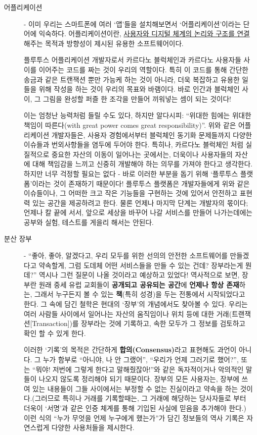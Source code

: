 \documentclass[a4paper, 11pt]{article}
\begin{document}
    \begin{description}
        \item[어플리케이션] - 이미 우리는 스마트폰에 여러 `앱'들을 설치해보면서 `어플리케이션'이라는 단어에 익숙하다. 어플리케이션이란, \uline{사용자와 디지털 체계의 논리와 구조를 연결}해주는 목적과 방향성이 제시된 유용한 소프트웨어이다.

        플루투스 어플리케이션 개발자로서 카르다노 블럭체인과 카르다노 사용자들 사이를 이어주는 코드를 짜는 것이 우리의 역할이다. 특히 이 코드를 통해 간단한 송금과 같은 트랜잭션 뿐만 가능케 하는 것이 아니라, 더욱 복잡하고 유용한 일들을 위해 작성을 하는 것이 우리의 목표와 바램이다. 바로 인간과 블럭체인 사이, 그 그림을 완성할 퍼즐 한 조각을 만들어 끼워넣는 셈이 되는 것이다!

        이는 엄청난 능력처럼 들릴 수도 있다, 하지만 알다시피: ``위대한 힘에는 위대한 책임이 따른다(with great power comes great responsibility)''. 위와 같은 어플리케이션 개발자들은, 사용자 경험에서부터 블럭체인 동기화 문제들까지 다양한 이슈들과 번외사항들을 염두에 두어야 한다. 특히나, 카르다노 블럭체인 처럼 실질적으로 중요한 자산의 이동이 일어나는 곳에서는, 더욱이나 사용자들의 자산에 대해 책임감을 느끼고 신중히 개발해야 하는 의무를 가져야 한다고 생각한다. 하지만 너무 걱정할 필요는 없다 - 바로 이러한 부분을 돕기 위해 `플루투스 플랫폼'이라는 것이 존재하기 때문이다! 플루투스 플랫폼은 개발자들에게 위와 같은 이슈들이나, 그 어떠한 크고 작은 기능들을 구현하는 것에 있어서 안전하고 표현력 있는 공간을 제공하려고 한다. 물론 언제나 마지막 단계는 개발자의 몫이다; 언제나 칼 끝에 서서, 앞으로 세상을 바꾸어 나갈 서비스를 만들어 나가는데에는 공부와 실험, 테스트를 게을리 해서는 안된다. 
        
        \item[분산 장부] - ``좋아, 좋아, 알겠다고, 우리 모두를 위한 선의의 안전한 소프트웨어를 만들겠다고 약속할게, 그럼 도데체 어떤 서비스들을 만들 수 있는 건데? 장부라는게 뭔데?'' 역시나 그런 질문이 나올 것이라고 예상하고 있었다! 역사적으로 보면, 장부란 원래 중세 유럽 교회들이 \textbf{공개되고 공유되는 공간}에 \textbf{언제나 항상 존재}하는, 그래서 누구든지 볼 수 있는 \textbf{책}(특히 성경)을 두는 전통에서 시작되었다고 한다. 그 속에 담긴 철학은 현대의 `장부'의 개념에서도 찾아볼 수 있다. 우리는 여러 사람들 사이에서 일어나는 자산의 움직임이나 위치 등에 대한 거래(트랜잭션[Transaction])를 장부라는 것에 기록하고, 속한 모두가 그 정보를 검토하고 확인 할 수 있게 한다.

        이러한 `기록'의 목적은 간단하게 \textbf{합의(Consensus)}라고 표현해도 과언이 아니다. 그 누가 함부로 ``아니야, 나 안 그랬어'', ``우리가 언제 그러기로 했어?'', 또는 ``뭐야! 저번에 그렇게 한다고 말해줬잖아!''와 같은 독자적이거나 악의적인 말들이 나오지 않도록 정리해야 되기 때문이다. 장부의 모든 사용자는, 장부에 쓰여 있는 내용들이 그들 사이에서는 부정할 수 없는 진실이라고 약속을 하는 것이다.(그러므로 특히나 거래를 기록할때는, 그 거래에 해당하는 당사자들로 부터 더욱이 `서명'과 같은 인증 체계를 통해 기입된 사실에 믿음을 추가해야 한다.) 이런 식의 ``누가 무엇을 언제 누구에게 했는가''가 담긴 정보들의 역사 기록은 자연스럽게 다양한 사용처들을 제시한다.


\end{description}
\end{document}
